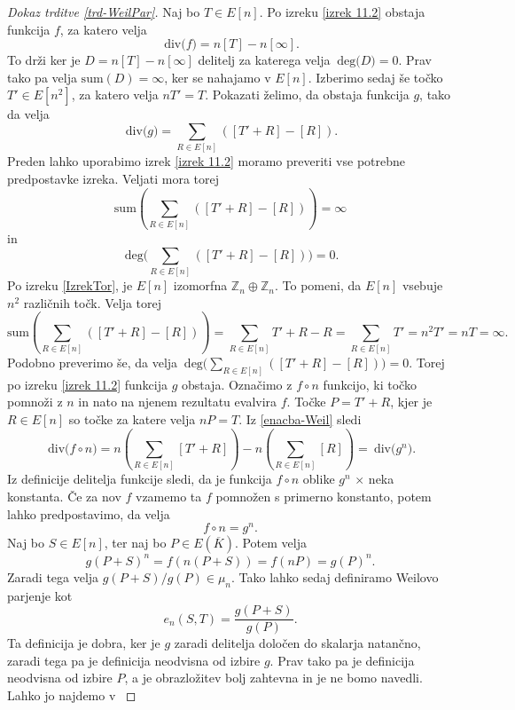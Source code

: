 \documentclass[12pt,a4paper,twoside]{article}
\theoremstyle{definition} %
\theoremstyle{plain} %
\numberwithin{equation}{section}  %
\newcommand{\E}[1]{E({#1})}
\newcommand{\DEG}[1]{\ \text{deg(}{#1}\text{)}}
\newcommand{\Div}[1]{\ \text{div(}{#1}\text{)}}
\begin{document}
\begin{proof}[Dokaz trditve \ref{trd-WeilPar}]
Naj bo $T \in E[n]$.
Po izreku \ref{izrek 11.2} obstaja funkcija $f$, za katero velja
\begin{equation}
\label{enacba-Weil}
\Div{f} = n[T]-n[\infty].
\end{equation}
To drži ker je $D = n[T]-n[\infty]$ delitelj za katerega velja $\DEG{D} = 0$. Prav tako pa velja $\text{sum}(D) = \infty$, ker se nahajamo v $E[n]$.
Izberimo sedaj še točko $T' \in E[n^2]$, za katero velja $nT' = T$. Pokazati želimo, da obstaja funkcija $g$, tako da velja
$$\Div{g} = \sum_{R \in E[n]}([T' + R]- [R]).$$
Preden lahko uporabimo izrek \ref{izrek 11.2} moramo preveriti vse potrebne predpostavke izreka. Veljati mora torej 
$$\text{sum}( \sum_{R \in E[n]}([T' + R]- [R])) = \infty$$
 in
 $$\DEG{ \sum_{R \in E[n]}([T' + R]- [R])} = 0.$$
Po izreku \ref{IzrekTor}, je $E[n]$ izomorfna $\mathbb{Z}_n \oplus \mathbb{Z}_n$. To pomeni, da $E[n]$ vsebuje $n^2$ različnih točk. Velja torej
$$\text{sum}(\sum_{R \in E[n]}([T' + R]- [R])) = \sum_{R \in E[n]} T' +R-R = \sum_{R \in E[n]} T' = n^2T' = nT = \infty.$$
Podobno preverimo še, da velja $\DEG{\sum_{R \in E[n]}([T' + R]- [R])} = 0.$ Torej po izreku \ref{izrek 11.2} funkcija $g$ obstaja.
Označimo z $f \circ n$ funkcijo, ki točko pomnoži z $n$ in nato na njenem rezultatu evalvira $f$. Točke $P = T' + R$, kjer je $R\in E[n]$ so točke za katere velja $nP=T$. Iz \ref{enacba-Weil}
sledi
$$\Div{f \circ n} = n(\sum_{R \in E[n]}[T' + R]) - n(\sum_{R \in E[n]}[R]) = \Div{g^n}.$$
Iz definicije delitelja funkcije sledi, da je funkcija $f \circ n$ oblike $g^n$ $\times$ neka konstanta. Če za nov $f$ vzamemo ta $f$ pomnožen s primerno konstanto, potem lahko predpostavimo, da velja
$$f \circ n = g^n.$$
Naj bo $S \in E[n]$, ter naj bo $P \in \E{\overline{K}}$. Potem velja
$$g(P+S)^n = f(n(P+S)) = f(nP) = g(P)^n.$$
Zaradi tega velja $g(P+S)/g(P) \in \mu_n$.
Tako lahko sedaj definiramo Weilovo parjenje kot
$$e_n(S,T) = \frac{g(P+S)}{g(P)}.$$
Ta definicija je dobra, ker je $g$ zaradi delitelja določen do skalarja natančno, zaradi tega pa je definicija neodvisna od izbire $g$. Prav tako pa je definicija neodvisna od izbire $P$, a je obrazložitev bolj zahtevna in je ne bomo navedli. Lahko jo najdemo v \cite{Silverman2009}


\end{proof}
\end{document}
